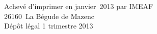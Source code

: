 \cleardoublepage
\mbox{}
\vfill

{\scriptsize
\begin{center}
Achevé d'imprimer en janvier~2013 par IMEAF \\
26160~La Bégude de Mazenc \\[\baselineskip]

Dépôt légal\frcolon{} 1 trimestre 2013
\end{center}
}
\enlargethispage{\footskip}


